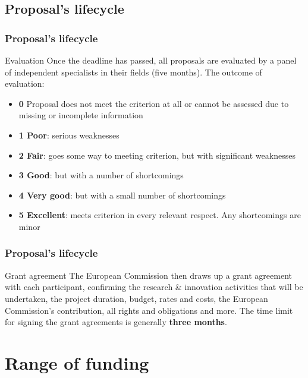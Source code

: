 \documentclass[compress,9pt,xcolor={dvipsnames,table}]{beamer}
\begin{document}
\subsection{Proposal's lifecycle}
\begin{frame}\frametitle{Proposal's lifecycle}
\begin{block}{Evaluation}
Once the deadline has passed, all proposals are evaluated by a panel of independent specialists in their fields (five months).
The outcome of evaluation:
\begin{itemize}
  \item \textbf{0} Proposal does not meet the criterion at all or cannot be assessed due to missing or incomplete information
    \item \textbf{1 Poor}: serious weaknesses
    \item \textbf{2 Fair}: goes some way to meeting criterion, but with significant weaknesses
    \item \textbf{3 Good}: but with a number of shortcomings
    \item \textbf{4 Very good}: but with a small number of shortcomings
    \item \textbf{5 Excellent}: meets criterion in every relevant respect. Any shortcomings are minor
\end{itemize}
\end{block}
\end{frame}


\begin{frame}\frametitle{Proposal's lifecycle}    
\begin{block}{Grant agreement}
The European Commission then draws up a grant agreement with each participant, confirming the research \& innovation activities that will be undertaken, the project duration, budget, rates and costs, the European Commission's contribution, all rights and obligations and more.
The time limit for signing the grant agreements is generally \textbf{three months}.
\end{block}

\end{frame}

\section{Range of funding}
\end{document}
